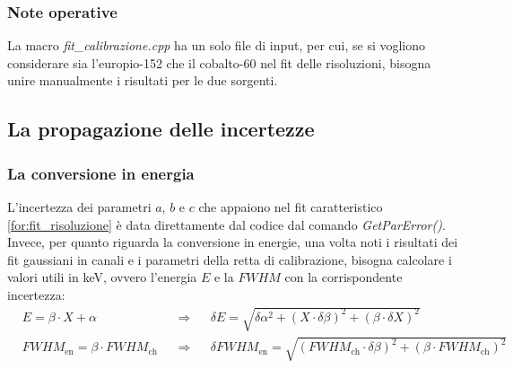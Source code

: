\documentclass{article}
\begin{document}
                \subsubsection*{Note operative}
                    La macro \textit{fit\_calibrazione.cpp} ha un solo file di input, per cui, se si vogliono considerare sia l'europio-152 che il cobalto-60 nel fit delle risoluzioni, bisogna unire manualmente i risultati per le due sorgenti.
                    
            \subsection*{La propagazione delle incertezze}
                \subsubsection*{La conversione in energia}
                    L'incertezza dei parametri $a$, $b$ e $c$ che appaiono nel fit caratteristico \eqref{for:fit_risoluzione} è data direttamente dal codice dal comando \textit{GetParError()}.
                    Invece, per quanto riguarda la conversione in energie, una volta noti i risultati dei fit gaussiani in canali e i parametri della retta di calibrazione, bisogna calcolare i valori utili in \si{\kilo\electronvolt}, ovvero l'energia $E$ e la $FWHM$ con la corrispondente incertezza:
                    \begin{align*}
                        &E=\beta\cdot X+\alpha&&\Rightarrow&&\delta E=\sqrt{\delta\alpha^2+(X\cdot\delta\beta)^2+(\beta\cdot\delta X)^2}\\
                        &FWHM_{\text{en}}=\beta\cdot FWHM_{\text{ch}}&&\Rightarrow&&\delta FWHM_{\text{en}}=\sqrt{(FWHM_{\text{ch}}\cdot\delta\beta)^2+(\beta\cdot FWHM_{\text{ch}})^2}
                    \end{align*}                    
\end{document}
